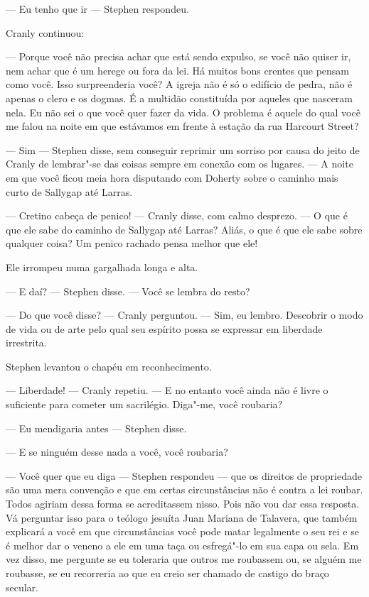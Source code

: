  --- Eu tenho que ir --- Stephen respondeu.

Cranly continuou:

 --- Porque você não precisa achar que está sendo expulso, se você não
quiser ir, nem achar que é um herege ou fora da lei. Há muitos bons
crentes que pensam como você. Isso surpreenderia você? A igreja não é
só o edifício de pedra, não é apenas o clero e os dogmas. É a multidão
constituída por aqueles que nasceram nela. Eu não sei o que você quer
fazer da vida. O problema é aquele do qual você me falou na noite em
que estávamos em frente à estação da rua Harcourt Street?

 --- Sim --- Stephen disse, sem conseguir reprimir um sorriso por causa do
jeito de Cranly de lembrar"-se das coisas sempre em conexão com os
lugares. --- A noite em que você ficou meia hora disputando com Doherty
sobre o caminho mais curto de Sallygap até Larras.

 --- Cretino cabeça de penico! --- Cranly disse, com calmo desprezo. --- O que é
que ele sabe do caminho de Sallygap até Larras? Aliás, o que é que ele
sabe sobre qualquer coisa? Um penico rachado pensa melhor que ele!

Ele irrompeu numa gargalhada longa e alta.

 --- E daí? --- Stephen disse. --- Você se lembra do resto?

 --- Do que você disse? --- Cranly perguntou. --- Sim, eu lembro. Descobrir o modo
de vida ou de arte pelo qual seu espírito possa se expressar em
liberdade irrestrita.

Stephen levantou o chapéu em reconhecimento.

 --- Liberdade! --- Cranly repetiu. --- E no entanto você ainda não é livre o
suficiente para cometer um sacrilégio. Diga"-me, você roubaria?

 --- Eu mendigaria antes --- Stephen disse.

 --- E se ninguém desse nada a você, você roubaria?

 --- Você quer que eu diga --- Stephen respondeu --- que os direitos de
propriedade são uma mera convenção e que em certas circunstâncias não é
contra a lei roubar. Todos agiriam dessa forma se acreditassem nisso.
Pois não vou dar essa resposta. Vá perguntar isso para o teólogo
jesuíta Juan Mariana de Talavera, que também explicará a você em que   
circunstâncias você pode matar legalmente o seu rei e se é melhor dar o
veneno a ele em uma taça ou esfregá"-lo em sua capa ou sela. Em vez
disso, me pergunte se eu toleraria que outros me roubassem ou, se
alguém me roubasse, se eu recorreria ao que eu creio ser chamado de
castigo do braço secular.

